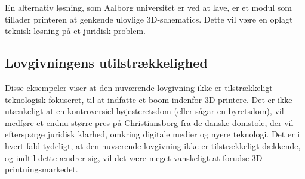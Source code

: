 En alternativ løsning, som Aalborg universitet er ved at lave, er et modul som tillader printeren at genkende ulovlige 3D-schematics. Dette vil være en oplagt teknisk løsning på et juridisk problem.

\subsection{Lovgivningens utilstrækkelighed}
 
Disse eksempeler viser at den nuværende lovgivning ikke er tilstrækkeligt teknologisk fokuseret, til at indfatte et boom indenfor 3D-printere. Det er ikke utænkeligt at en kontroversiel højesteretsdom (eller sågar en byretsdom), vil medføre et endnu større pres på Christiansborg fra de danske domstole, der vil efterspørge juridisk klarhed, omkring digitale medier og nyere teknologi.
Det er i hvert fald tydeligt, at den nuværende lovgivning ikke er tilstrækkeligt dækkende, og indtil dette ændrer sig, vil det være meget vanskeligt at forudse 3D-printningsmarkedet.

